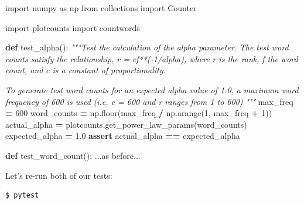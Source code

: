 \documentclass[
]{krantz}
\makeatletter
\newenvironment{Shaded}{\begin{snugshade}}{\end{snugshade}}
\newcommand{\CommentTok}[1]{\textcolor[rgb]{0.56,0.35,0.01}{\textit{#1}}}
\newcommand{\ControlFlowTok}[1]{\textcolor[rgb]{0.13,0.29,0.53}{\textbf{#1}}}
\newcommand{\DecValTok}[1]{\textcolor[rgb]{0.00,0.00,0.81}{#1}}
\newcommand{\FloatTok}[1]{\textcolor[rgb]{0.00,0.00,0.81}{#1}}
\newcommand{\ImportTok}[1]{#1}
\newcommand{\KeywordTok}[1]{\textcolor[rgb]{0.13,0.29,0.53}{\textbf{#1}}}
\newcommand{\NormalTok}[1]{#1}
\newcommand{\OperatorTok}[1]{\textcolor[rgb]{0.81,0.36,0.00}{\textbf{#1}}}
\newenvironment{kframe}{%
\medskip{}
\setlength{\fboxsep}{.8em}
 \def\at@end@of@kframe{}%
 \ifinner\ifhmode%
  \def\at@end@of@kframe{\end{minipage}}%
  \begin{minipage}{\columnwidth}%
 \fi\fi%
 \def\FrameCommand##1{\hskip\@totalleftmargin \hskip-\fboxsep
 \colorbox{shadecolor}{##1}\hskip-\fboxsep
     \hskip-\linewidth \hskip-\@totalleftmargin \hskip\columnwidth}%
 \MakeFramed {\advance\hsize-\width
   \@totalleftmargin\z@ \linewidth\hsize
   \@setminipage}}%
 {\par\unskip\endMakeFramed%
 \at@end@of@kframe}
\renewenvironment{Shaded}{\begin{kframe}}{\end{kframe}}
\makeatother
\begin{document}
\begin{Shaded}
\begin{Highlighting}[]
\ImportTok{import}\NormalTok{ numpy }\ImportTok{as}\NormalTok{ np}
\ImportTok{from}\NormalTok{ collections }\ImportTok{import}\NormalTok{ Counter}

\ImportTok{import}\NormalTok{ plotcounts}
\ImportTok{import}\NormalTok{ countwords}

\KeywordTok{def}\NormalTok{ test\_alpha():}
    \CommentTok{"""Test the calculation of the alpha parameter.}
\CommentTok{    }
\CommentTok{    The test word counts satisfy the relationship,}
\CommentTok{      r = cf**({-}1/alpha), where}
\CommentTok{      r is the rank,}
\CommentTok{      f the word count, and}
\CommentTok{      c is a constant of proportionality.}

\CommentTok{    To generate test word counts for an expected alpha value of 1.0,}
\CommentTok{      a maximum word frequency of 600 is used}
\CommentTok{      (i.e. c = 600 and r ranges from 1 to 600)}
\CommentTok{    """}    
\NormalTok{    max\_freq }\OperatorTok{=} \DecValTok{600}
\NormalTok{    word\_counts }\OperatorTok{=}\NormalTok{ np.floor(max\_freq }\OperatorTok{/}\NormalTok{ np.arange(}\DecValTok{1}\NormalTok{, max\_freq }\OperatorTok{+} \DecValTok{1}\NormalTok{))}
\NormalTok{    actual\_alpha }\OperatorTok{=}\NormalTok{ plotcounts.get\_power\_law\_params(word\_counts)}
\NormalTok{    expected\_alpha }\OperatorTok{=} \FloatTok{1.0}
    \ControlFlowTok{assert}\NormalTok{ actual\_alpha }\OperatorTok{==}\NormalTok{ expected\_alpha}

\KeywordTok{def}\NormalTok{ test\_word\_count():}
\NormalTok{    ...}\ImportTok{as}\NormalTok{ before...}
\end{Highlighting}
\end{Shaded}

Let's re-run both of our tests:

\begin{verbatim}
$ pytest
\end{verbatim}
\end{document}
